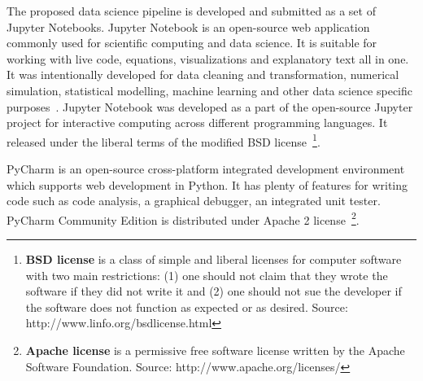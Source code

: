 The proposed data science pipeline is developed and submitted as a set of Jupyter Notebooks. Jupyter Notebook is an open-source web application commonly used for scientific computing and data science. It is suitable for working with live code, equations, visualizations and explanatory text all in one. It was intentionally developed for data cleaning and transformation, numerical simulation, statistical modelling, machine learning and other data science specific purposes~\cite{Jupyter_Notebook}. Jupyter Notebook was developed as a part of the open-source Jupyter project for interactive computing across different programming languages. It released under the liberal terms of the modified BSD license~\footnote{
\textbf{BSD license} is a class of simple and liberal licenses for computer software with two main restrictions: (1) one should not claim that they wrote the software if they did not write it and (2) one should not sue the developer if the software does not function as expected or as desired. Source: http://www.linfo.org/bsdlicense.html}.

PyCharm is an open-source cross-platform integrated development environment which supports web development in Python. It has plenty of features for writing code such as code analysis, a graphical debugger, an integrated unit tester. PyCharm Community Edition is distributed under Apache 2 license~\footnote{\textbf{Apache license} is a permissive free software license written by the Apache Software Foundation. Source: http://www.apache.org/licenses/}.

